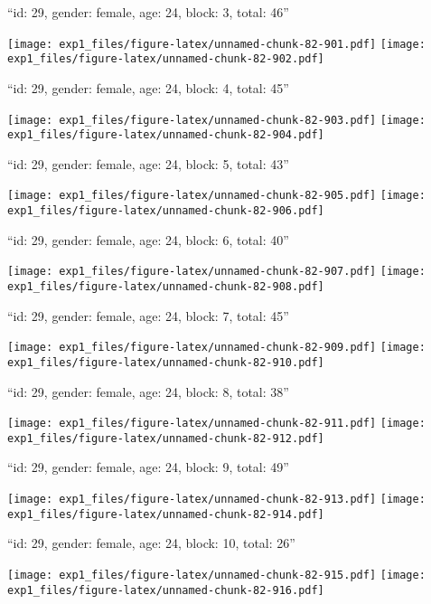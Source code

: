 \documentclass[11pt,,]{article}
\begin{document}
\newpage
[1] 

``id: 29, gender: female, age: 24, block: 3, total: 46''

\texttt{[image: exp1\_files/figure-latex/unnamed-chunk-82-901.pdf]}
\texttt{[image: exp1\_files/figure-latex/unnamed-chunk-82-902.pdf]}

\newpage
[1] 

``id: 29, gender: female, age: 24, block: 4, total: 45''

\texttt{[image: exp1\_files/figure-latex/unnamed-chunk-82-903.pdf]}
\texttt{[image: exp1\_files/figure-latex/unnamed-chunk-82-904.pdf]}

\newpage
[1] 

``id: 29, gender: female, age: 24, block: 5, total: 43''

\texttt{[image: exp1\_files/figure-latex/unnamed-chunk-82-905.pdf]}
\texttt{[image: exp1\_files/figure-latex/unnamed-chunk-82-906.pdf]}

\newpage
[1] 

``id: 29, gender: female, age: 24, block: 6, total: 40''

\texttt{[image: exp1\_files/figure-latex/unnamed-chunk-82-907.pdf]}
\texttt{[image: exp1\_files/figure-latex/unnamed-chunk-82-908.pdf]}

\newpage
[1] 

``id: 29, gender: female, age: 24, block: 7, total: 45''

\texttt{[image: exp1\_files/figure-latex/unnamed-chunk-82-909.pdf]}
\texttt{[image: exp1\_files/figure-latex/unnamed-chunk-82-910.pdf]}

\newpage
[1] 

``id: 29, gender: female, age: 24, block: 8, total: 38''

\texttt{[image: exp1\_files/figure-latex/unnamed-chunk-82-911.pdf]}
\texttt{[image: exp1\_files/figure-latex/unnamed-chunk-82-912.pdf]}

\newpage
[1] 

``id: 29, gender: female, age: 24, block: 9, total: 49''

\texttt{[image: exp1\_files/figure-latex/unnamed-chunk-82-913.pdf]}
\texttt{[image: exp1\_files/figure-latex/unnamed-chunk-82-914.pdf]}

\newpage
[1] 

``id: 29, gender: female, age: 24, block: 10, total: 26''

\texttt{[image: exp1\_files/figure-latex/unnamed-chunk-82-915.pdf]}
\texttt{[image: exp1\_files/figure-latex/unnamed-chunk-82-916.pdf]}
\end{document}
